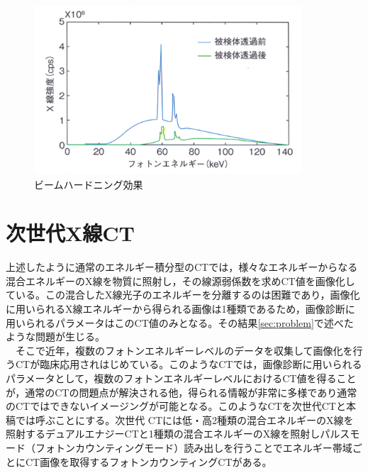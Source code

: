 \begin{figure}[H]
 \begin{minipage}{1\hsize}
  \begin{center}
   \includegraphics[width=10cm]{image/other/beam_hard.eps}
  \end{center}
  \vspace{-0.9cm}\hspace{8cm}
  
 \end{minipage}
 \begin{center}
  \vspace{-1zh}
  \caption{ビームハードニング効果\cite{spectralCT}}
  \label{fig:beam_hard}
  \end{center}
\end{figure}






\section{次世代X線CT}
上述したように通常のエネルギー積分型のCTでは，様々なエネルギーからなる混合エネルギーのX線を物質に照射し，その線源弱係数を求めCT値を画像化している。この混合したX線光子のエネルギーを分離するのは困難であり，画像化に用いられるX線エネルギーから得られる画像は1種類であるため，画像診断に用いられるパラメータはこのCT値のみとなる。その結果\ref{sec:problem}で述べたような問題が生じる。\\
\ \ そこで近年，複数のフォトンエネルギーレベルのデータを収集して画像化を行うCTが臨床応用されはじめている。このようなCTでは，画像診断に用いられるパラメータとして，複数のフォトンエネルギーレベルにおけるCT値を得ることが，通常のCTの問題点が解決される他，得られる情報が非常に多様であり通常のCTではできないイメージングが可能となる。このようなCTを次世代CTと本稿では呼ぶことにする。次世代
CTには低・高2種類の混合エネルギーのX線を照射するデュアルエナジーCTと1種類の混合エネルギーのX線を照射しパルスモード（フォトンカウンティングモード）読み出しを行うことでエネルギー帯域ごとにCT画像を取得するフォトンカウンティングCTがある。

